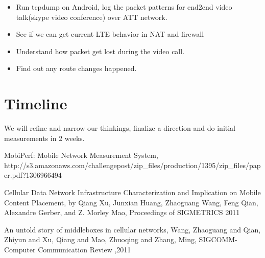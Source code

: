 \documentclass[]{article}
\begin{document}
\begin{itemize}
 \item Run tcpdump on Android, log the packet patterns for end2end video talk(skype video conference) over ATT network.
 \item See if we can get current LTE behavior in NAT and firewall
 \item Understand how packet get lost during the video call. 
 \item Find out any route changes happened. 
\end{itemize}

\section{Timeline}

We will refine and narrow our thinkings, finalize a direction and do initial measurements in 2 weeks.

\begin{thebibliography}{20}

 MobiPerf: Mobile Network Measurement System,\\\small{http://s3.amazonaws.com/challengepost/zip\_files/production/1395/zip\_files/paper.pdf?1306966494}

 Cellular Data Network Infrastructure Characterization and Implication on Mobile Content Placement, by Qiang Xu, Junxian Huang, Zhaoguang Wang, Feng Qian, Alexandre Gerber, and Z. Morley Mao, Proceedings of SIGMETRICS 2011

 An untold story of middleboxes in cellular networks, Wang, Zhaoguang and Qian, Zhiyun and Xu, Qiang and Mao, Zhuoqing and Zhang, Ming, SIGCOMM-Computer Communication Review ,2011

\end{thebibliography}
\end{document}
